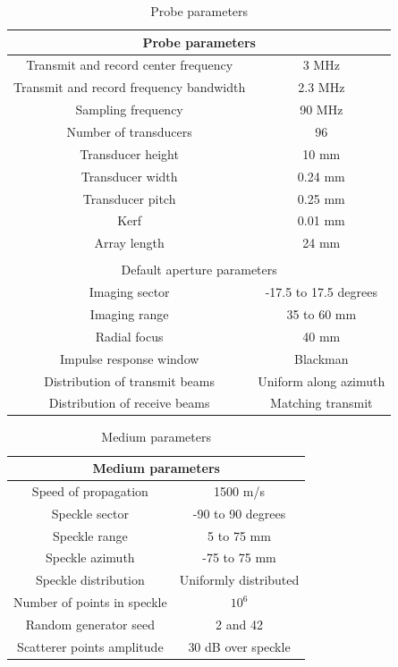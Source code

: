 \begin{table}[!ht]
\centering
\begin{tabular}{|*{2}{c|}}
 \hline
 \multicolumn{2}{c}{Probe parameters} \\
  \hline
  Transmit and record center frequency    &   3 MHz \\
  Transmit and record frequency bandwidth    &   2.3 MHz \\
  Sampling frequency    &   90 MHz \\
  Number of transducers &   96 \\
  Transducer height   &   10 mm \\
  Transducer width   &   0.24 mm \\
  Transducer pitch   &   0.25 mm \\
  Kerf   &   0.01 mm \\
  Array length   &   24 mm \\
  \hline
  \multicolumn{2}{c}{} \\
  
  \hline
  \multicolumn{2}{c}{Default aperture parameters} \\
  \hline
  Imaging sector  &   -17.5 to 17.5 degrees \\
  Imaging range     &   35 to 60 mm \\
  Radial focus   &   40 mm \\
  Impulse response window   &   Blackman \\
  Distribution of transmit beams   &   Uniform along azimuth \\
  Distribution of receive beams   &   Matching transmit \\
  \hline
 \end{tabular}
\caption{Probe parameters}
\label{table:aperture_param}
\end{table}
  
\begin{table}[!ht]
\centering
\begin{tabular}{|*{2}{c|}}
 \hline
 \multicolumn{2}{c}{Medium parameters} \\
  \hline
  Speed of propagation    &   1500 m/s \\
  Speckle sector    &   -90 to 90 degrees \\
  Speckle range     &   5 to 75 mm \\
  Speckle azimuth   &   -75 to 75 mm \\
  Speckle distribution  &   Uniformly distributed \\
  Number of points in speckle    &   $10^6$ \\
  Random generator seed     &   2 and 42 \\
  Scatterer points amplitude   &   30 dB over speckle \\
  \hline
 \end{tabular}
\caption{Medium parameters}
\label{table:medium_param}
\end{table} 

